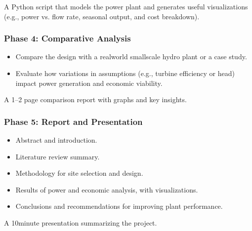 \documentclass[letterpaper,10pt,english]{jupyterBook}
\begin{document}
\sphinxAtStartPar
{} A Python script that models the power plant and
generates useful visualizations (e.g., power vs. flow rate, seasonal
output, and cost breakdown).


\subsubsection{Phase 4: Comparative Analysis}
\label{\detokenize{ProjectInstructions:phase-4-comparative-analysis}}
\sphinxAtStartPar
{}
\begin{itemize}
\item {} 
\sphinxAtStartPar
Compare the design with a real\sphinxhyphen{}world small\sphinxhyphen{}scale hydro plant or a
case study.

\item {} 
\sphinxAtStartPar
Evaluate how variations in assumptions (e.g., turbine efficiency or
head) impact power generation and economic viability.

\end{itemize}

\sphinxAtStartPar
{} A 1–2 page comparison report with graphs and key
insights.


\subsubsection{Phase 5: Report and Presentation}
\label{\detokenize{ProjectInstructions:id16}}
\sphinxAtStartPar
{}
\begin{itemize}
\item {} 
\sphinxAtStartPar
Abstract and introduction.

\item {} 
\sphinxAtStartPar
Literature review summary.

\item {} 
\sphinxAtStartPar
Methodology for site selection and design.

\item {} 
\sphinxAtStartPar
Results of power and economic analysis, with visualizations.

\item {} 
\sphinxAtStartPar
Conclusions and recommendations for improving plant performance.

\end{itemize}

\sphinxAtStartPar
{} A 10\sphinxhyphen{}minute presentation summarizing the project.
\end{document}
